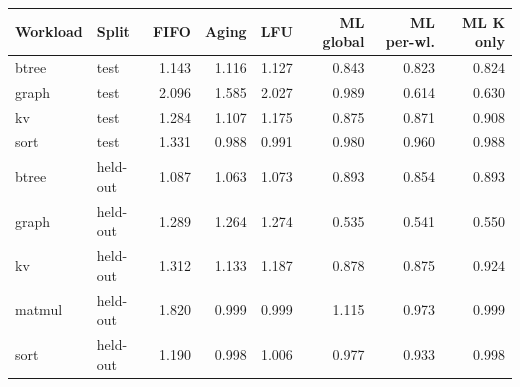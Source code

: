 \begin{tabular}{@{}llrrrrrr@{}}
\toprule
\textbf{Workload} & \textbf{Split} & \textbf{FIFO} & \textbf{Aging} & \textbf{LFU} & \textbf{ML global} & \textbf{ML per-wl.} & \textbf{ML K only} \\
\midrule
btree & test & 1.143 & 1.116 & 1.127 & 0.843 & 0.823 & 0.824 \\
graph & test & 2.096 & 1.585 & 2.027 & 0.989 & 0.614 & 0.630 \\
kv & test & 1.284 & 1.107 & 1.175 & 0.875 & 0.871 & 0.908 \\
sort & test & 1.331 & 0.988 & 0.991 & 0.980 & 0.960 & 0.988 \\
btree & held-out & 1.087 & 1.063 & 1.073 & 0.893 & 0.854 & 0.893 \\
graph & held-out & 1.289 & 1.264 & 1.274 & 0.535 & 0.541 & 0.550 \\
kv & held-out & 1.312 & 1.133 & 1.187 & 0.878 & 0.875 & 0.924 \\
matmul & held-out & 1.820 & 0.999 & 0.999 & 1.115 & 0.973 & 0.999 \\
sort & held-out & 1.190 & 0.998 & 1.006 & 0.977 & 0.933 & 0.998 \\
\bottomrule
\end{tabular}

